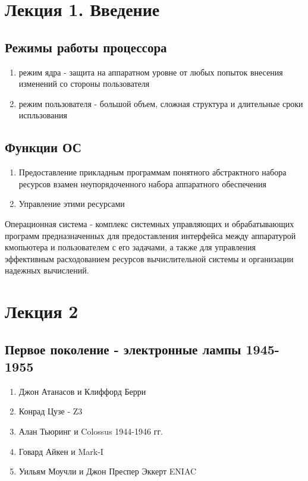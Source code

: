 \documentclass[a4paper]{article}
\begin{document}
    
\section{Лекция 1. Введение}

\subsection{Режимы работы процессора}
\begin{enumerate}
\item режим ядра - защита на аппаратном уровне от любых попыток внесения изменений со стороны пользователя
\item режим пользователя - большой объем, сложная структура и длительные сроки испльзования
\end{enumerate}

\subsection{Функции ОС}
\begin{enumerate}
\item Предоставление прикладным программам понятного абстрактного набора ресурсов взамен неупорядоченного набора аппаратного обеспечения
\item Управление этими ресурсами
\end{enumerate}

Операционная система - комплекс системных управляющих и обрабатывающих программ предназначенных для предоставления интерфейса между аппаратурой кмопьютера и пользователем с его задачами, а также для управления эффективным расходованием ресурсов вычислительной системы и организации надежных вычислений.

\section{Лекция 2}

\subsection{Первое поколение - электронные лампы 1945-1955}
\begin{enumerate}
\item Джон Атанасов и Клиффорд Берри
\item Конрад Цузе - Z3
\item Алан Тьюринг и Colossus 1944-1946 гг.
\item Говард Айкен и Mark-I
\item Уильям Моучли и Джон Преспер Эккерт ENIAC
\end{enumerate}
\end{document}
